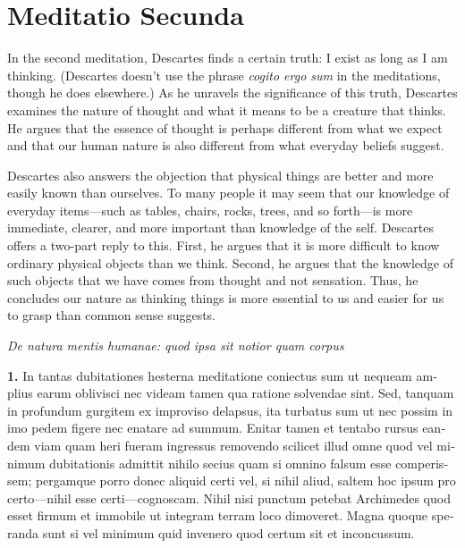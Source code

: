 \chapter{Meditatio Secunda}


In the second meditation, Descartes finds a certain truth: I exist as long as I am thinking. (Descartes doesn't use the phrase \textit{cogito ergo sum} in the meditations, though he does elsewhere.) As he unravels the significance of this truth, Descartes examines the nature of thought and what it means to be a creature that thinks. He argues that the essence of thought is perhaps different from what we expect and that our human nature is also different from what everyday beliefs suggest.

Descartes also answers the objection that physical things are better and more easily known than ourselves. To many people it may seem that our knowledge of everyday items---such as tables, chairs, rocks, trees, and so forth---is more immediate, clearer, and more important than knowledge of the self. Descartes offers a two-part reply to this. First, he argues that it is more difficult to know ordinary physical objects than we think. Second, he argues that the knowledge of such objects that we have comes from thought and not sensation. Thus, he concludes our nature as thinking things is more essential to us and easier for us to grasp than common sense suggests.

\clearpage

\clearpage
\begin{center}
    \beginnumbering
    \numberlinefalse
    \pstart
    \textit{De natura mentis humanae: quod ipsa sit notior quam corpus}
    \pend
    \endnumbering
\end{center}

\beginnumbering
\pstart
\begin{latin}
    \textenglish{\textbf{1.}} In tantas dubitationes hesterna meditatione coniectus sum ut nequeam amplius earum oblivisci nec videam tamen qua ratione solvendae sint. Sed, tanquam in profundum gurgitem ex improviso delapsus, ita turbatus sum ut nec possim in imo pedem figere nec enatare ad summum. Enitar tamen et tentabo rursus eandem viam quam heri fueram ingressus removendo scilicet illud omne quod vel minimum dubitationis admittit nihilo secius quam si omnino falsum esse comperissem; pergamque porro donec aliquid certi vel, si nihil aliud, saltem hoc ipsum pro certo---nihil esse certi---cognoscam. Nihil nisi punctum petebat Archimedes quod esset firmum et immobile ut integram terram loco dimoveret. Magna quoque speranda sunt si vel minimum quid invenero quod certum sit et inconcussum.
\end{latin}
\pend
\endnumbering

